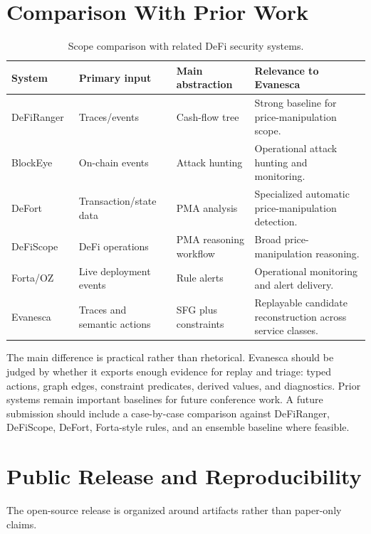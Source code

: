 \documentclass[10pt]{article}
\newcommand{\sys}{Evanesca\xspace}
\newcommand{\defiranger}{DeFiRanger\xspace}
\begin{document}
\section{Comparison With Prior Work}
\label{sec:prior}

\begin{table}[t]
\centering
\caption{Scope comparison with related DeFi security systems.}
\label{tab:comparison}
\begin{tabularx}{\linewidth}{lXXX}
\toprule
System & Primary input & Main abstraction & Relevance to \sys \\
\midrule
\defiranger~\cite{wu2021defiranger} & Traces/events & Cash-flow tree & Strong baseline for price-manipulation scope. \\
BlockEye~\cite{wang2021blockeye} & On-chain events & Attack hunting & Operational attack hunting and monitoring. \\
DeFort~\cite{defort2024} & Transaction/state data & PMA analysis & Specialized automatic price-manipulation detection. \\
DeFiScope~\cite{zhong2025defiscope} & DeFi operations & PMA reasoning workflow & Broad price-manipulation reasoning. \\
Forta/OZ~\cite{forta2023whitepaper,ozdefender} & Live deployment events & Rule alerts & Operational monitoring and alert delivery. \\
\sys & Traces and semantic actions & SFG plus constraints & Replayable candidate reconstruction across service classes. \\
\bottomrule
\end{tabularx}
\end{table}

The main difference is practical rather than rhetorical. \sys should be judged
by whether it exports enough evidence for replay and triage: typed actions,
graph edges, constraint predicates, derived values, and diagnostics. Prior
systems remain important baselines for future conference work. A future
submission should include a case-by-case comparison against DeFiRanger,
DeFiScope, DeFort, Forta-style rules, and an ensemble baseline where feasible.

\section{Public Release and Reproducibility}
\label{sec:release}

The open-source release is organized around artifacts rather than paper-only
claims.
\end{document}
